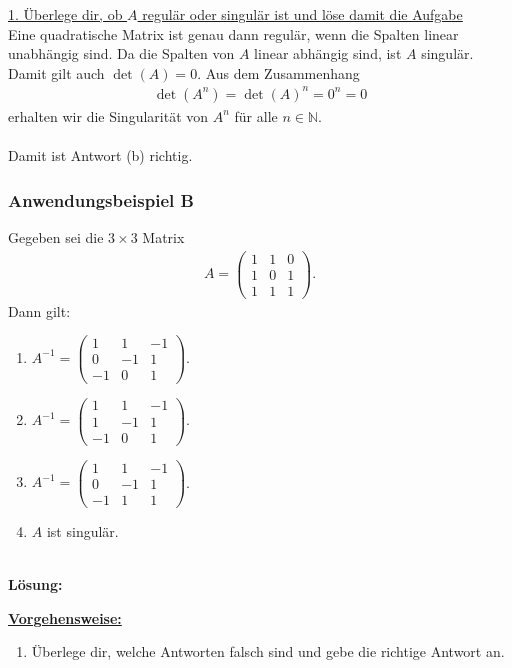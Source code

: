 \underline{1. Überlege dir, ob $A$ regulär oder singulär ist und löse damit die Aufgabe}\\
Eine quadratische Matrix ist genau dann regulär, wenn die Spalten linear unabhängig sind.
Da die Spalten von $A$ linear abhängig sind, ist $A$ singulär.
Damit gilt auch $\det(A) = 0$.
Aus dem Zusammenhang
\begin{align*}
\det\left(A^n\right) = \det(A)^n = 0^n = 0
\end{align*}
erhalten wir die Singularität von $A^n$ für alle $n \in \mathbb{N}$.
\\
\ \\
Damit ist Antwort (b) richtig.
\newpage
\subsubsection*{Anwendungsbeispiel B}
Gegeben sei die $3 \times 3 $ Matrix
\begin{align*}
A
= 
\begin{pmatrix}
1 & 1 & 0\\
1 & 0 & 1 \\
1 & 1 & 1
\end{pmatrix}.
\end{align*}
Dann gilt:
\renewcommand{\labelenumi}{(\alph{enumi})}
\begin{enumerate}
\item 
$A^{-1}
= 
\begin{pmatrix}
1 & 1 & -1 \\
0 & -1 & 1\\
-1 & 0 & 1
\end{pmatrix}$.
\item
$A^{-1}
= 
\begin{pmatrix}
1 & 1 & -1 \\
1 & -1 & 1\\
-1 & 0 & 1
\end{pmatrix}$.
\item
$A^{-1}
= 
\begin{pmatrix}
1 & 1 & -1 \\
0 & -1 & 1\\
-1 & 1 & 1
\end{pmatrix}$.
\item
$A$ ist singulär.
\end{enumerate}
\ \\
\textbf{Lösung:}
\begin{mdframed}
\underline{\textbf{Vorgehensweise:}}
\renewcommand{\labelenumi}{\theenumi.}
\begin{enumerate}
\item Überlege dir, welche Antworten falsch sind und gebe die richtige Antwort an.

\end{enumerate}
\end{mdframed}

